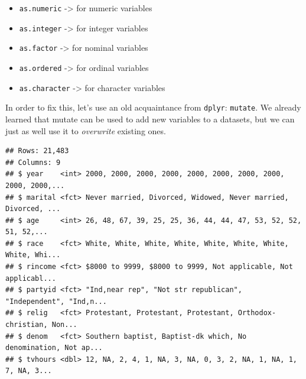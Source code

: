 \documentclass[]{tufte-book}
\newenvironment{Shaded}{}{}
\newcommand{\DataTypeTok}[1]{\textcolor[rgb]{0.56,0.13,0.00}{#1}}
\newcommand{\KeywordTok}[1]{\textcolor[rgb]{0.00,0.44,0.13}{\textbf{#1}}}
\newcommand{\NormalTok}[1]{#1}
\newcommand{\OperatorTok}[1]{\textcolor[rgb]{0.40,0.40,0.40}{#1}}
\newcommand{\StringTok}[1]{\textcolor[rgb]{0.25,0.44,0.63}{#1}}
\providecommand{\tightlist}{%
  \setlength{\itemsep}{0pt}\setlength{\parskip}{0pt}}
\begin{document}
\begin{itemize}
\tightlist
\item
  \texttt{as.numeric} -\textgreater{} for numeric variables
\item
  \texttt{as.integer} -\textgreater{} for integer variables
\item
  \texttt{as.factor} -\textgreater{} for nominal variables
\item
  \texttt{as.ordered} -\textgreater{} for ordinal variables
\item
  \texttt{as.character} -\textgreater{} for character variables
\end{itemize}

In order to fix this, let's use an old acquaintance from \texttt{dplyr}: \texttt{mutate}. We already learned that mutate can be used to add new variables to a datasets, but we can just as well use it to \emph{overwrite} existing ones.

\begin{Shaded}
\end{Shaded}

\begin{verbatim}
## Rows: 21,483
## Columns: 9
## $ year    <int> 2000, 2000, 2000, 2000, 2000, 2000, 2000, 2000, 2000, 2000,...
## $ marital <fct> Never married, Divorced, Widowed, Never married, Divorced, ...
## $ age     <int> 26, 48, 67, 39, 25, 25, 36, 44, 44, 47, 53, 52, 52, 51, 52,...
## $ race    <fct> White, White, White, White, White, White, White, White, Whi...
## $ rincome <fct> $8000 to 9999, $8000 to 9999, Not applicable, Not applicabl...
## $ partyid <fct> "Ind,near rep", "Not str republican", "Independent", "Ind,n...
## $ relig   <fct> Protestant, Protestant, Protestant, Orthodox-christian, Non...
## $ denom   <fct> Southern baptist, Baptist-dk which, No denomination, Not ap...
## $ tvhours <dbl> 12, NA, 2, 4, 1, NA, 3, NA, 0, 3, 2, NA, 1, NA, 1, 7, NA, 3...
\end{verbatim}
\end{document}
